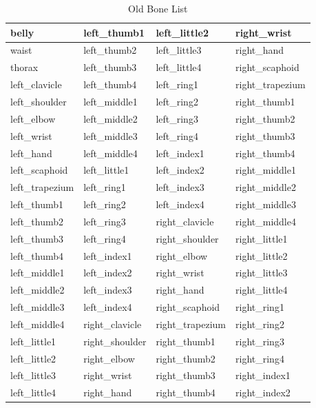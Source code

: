 \documentclass[../main.tex]{subfiles}
\begin{document}
\begin{longtable}{|l|l|l|l|}
    \caption{Old Bone List}
    \label{tab:old_bone_list} \\
    \hline
    belly & left\_thumb1 & left\_little2 & right\_wrist \\ \hline
    waist & left\_thumb2 & left\_little3 & right\_hand \\ \hline
    thorax & left\_thumb3 & left\_little4 & right\_scaphoid \\ \hline
    left\_clavicle & left\_thumb4 & left\_ring1 & right\_trapezium \\ \hline
    left\_shoulder & left\_middle1 & left\_ring2 & right\_thumb1 \\ \hline
    left\_elbow & left\_middle2 & left\_ring3 & right\_thumb2 \\ \hline
    left\_wrist & left\_middle3 & left\_ring4 & right\_thumb3 \\ \hline
    left\_hand & left\_middle4 & left\_index1 & right\_thumb4 \\ \hline
    left\_scaphoid & left\_little1 & left\_index2 & right\_middle1 \\ \hline
    left\_trapezium & left\_ring1 & left\_index3 & right\_middle2 \\ \hline
    left\_thumb1 & left\_ring2 & left\_index4 & right\_middle3 \\ \hline
    left\_thumb2 & left\_ring3 & right\_clavicle & right\_middle4 \\ \hline
    left\_thumb3 & left\_ring4 & right\_shoulder & right\_little1 \\ \hline
    left\_thumb4 & left\_index1 & right\_elbow & right\_little2 \\ \hline
    left\_middle1 & left\_index2 & right\_wrist & right\_little3 \\ \hline
    left\_middle2 & left\_index3 & right\_hand & right\_little4 \\ \hline
    left\_middle3 & left\_index4 & right\_scaphoid & right\_ring1 \\ \hline
    left\_middle4 & right\_clavicle & right\_trapezium & right\_ring2 \\ \hline
    left\_little1 & right\_shoulder & right\_thumb1 & right\_ring3 \\ \hline
    left\_little2 & right\_elbow & right\_thumb2 & right\_ring4 \\ \hline
    left\_little3 & right\_wrist & right\_thumb3 & right\_index1 \\ \hline
    left\_little4 & right\_hand & right\_thumb4 & right\_index2 \\ \hline

\end{longtable}
\end{document}
